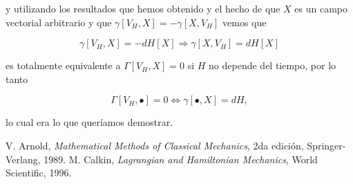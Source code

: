 \documentclass[a4paper,10pt]{article}
\numberwithin{equation}{section}
\begin{document}
y utilizando los resultados que hemos obtenido y el hecho de que $X$ es un campo 
vectorial arbitrario y que $ \gamma[V_H,X] =  - \gamma[X,V_H]$ vemos que 

\begin{equation}
 \gamma[V_H,X] = - dH[X] \Rightarrow \gamma[X,V_H] = dH[X]
\end{equation}

es totalmente equivalente a $\Gamma[V_H,X] = 0$ si $H$ no depende del tiempo, por lo tanto 

\begin{equation}
 \Gamma[V_H,\bullet] = 0 \Leftrightarrow \gamma[\bullet,X] = dH,
\end{equation}

lo cual era lo que queríamos demostrar. 

\begin{thebibliography}{10}
V. Arnold, \emph{Mathematical Methods of Classical Mechanics}, 2da edición, Springer-Verlang, 
1989.
M. Calkin, \emph{Lagrangian and Hamiltonian Mechanics}, World Scientific, 1996.
\end{thebibliography}
\end{document}
